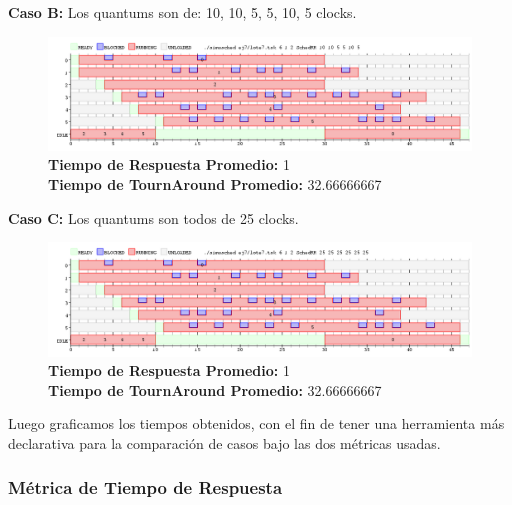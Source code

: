 \documentclass[a4paper]{article}
\begin{document}
	\textbf{Caso B:}  Los quantums son de: 10, 10, 5, 5, 10, 5 clocks.
	
			 \begin{figure}[h!]
   \begin{center}
 	\includegraphics[scale=0.5]{imagenes/ej7/6nucleoB.png}
 	\textbf{Tiempo de Respuesta Promedio:} 1 \\
 	\textbf{Tiempo de TournAround Promedio:} 32.66666667 \\
   \end{center}
 \end{figure} 
 
	\textbf{Caso C:}  Los quantums son todos de 25 clocks.
	
		 \begin{figure}[h!]
   \begin{center}
 	\includegraphics[scale=0.5]{imagenes/ej7/6nucleoC.png}
 	\textbf{Tiempo de Respuesta Promedio:} 1 \\
 	\textbf{Tiempo de TournAround Promedio:} 32.66666667 \\
   \end{center}
 \end{figure} 

\newpage

Luego graficamos los tiempos obtenidos, con el fin de tener una herramienta m\'as declarativa para la comparaci\'on de casos bajo las dos m\'etricas usadas.

\subsubsection*{M\'etrica de Tiempo de Respuesta}
\end{document}
